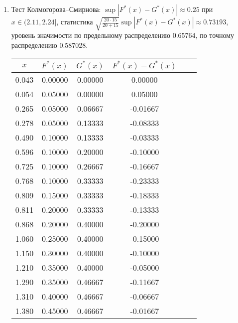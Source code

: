 \documentclass[a4paper,12pt]{article}
\newcommand{\modulus}[1]{\left | #1 \right |}
\begin{document}
\begin{enumerate}
        \item Тест Колмогорова--Смирнова: $\sup \modulus{F^*(x) - G^*(x)} \approx 0.25$ при $x \in (2.11, 2.24]$, статистика
              $\sqrt{\frac{20 \cdot 15}{20 + 15}} \sup \modulus{F^*(x) - G^*(x)} \approx 0.73193$, уровень значимости по предельному распределению 0.65764,
              по точному распределению 0.587028.

              \begin{tabular}{|c|c|c|c|c|c|}
                  \hline
                  $x$   & $F^*(x)$ & $G^*(x)$ & $F^*(x) - G^*(x)$        \\
                  \hline
                  0.043 & 0.00000  & 0.00000  & 0.00000                  \\
                  0.054 & 0.05000  & 0.00000  & 0.05000                  \\
                  0.265 & 0.05000  & 0.06667  & -0.01667                 \\
                  0.278 & 0.05000  & 0.13333  & -0.08333                 \\
                  0.490 & 0.10000  & 0.13333  & -0.03333                 \\
                  0.596 & 0.10000  & 0.20000  & -0.10000                 \\
                  0.725 & 0.10000  & 0.26667  & -0.16667                 \\
                  0.768 & 0.10000  & 0.33333  & -0.23333                 \\
                  0.809 & 0.15000  & 0.33333  & -0.18333                 \\
                  0.811 & 0.20000  & 0.33333  & -0.13333                 \\
                  0.868 & 0.20000  & 0.40000  & -0.20000                 \\
                  1.060 & 0.25000  & 0.40000  & -0.15000                 \\
                  1.150 & 0.30000  & 0.40000  & -0.10000                 \\
                  1.210 & 0.35000  & 0.40000  & -0.05000                 \\
                  1.290 & 0.35000  & 0.46667  & -0.11667                 \\
                  1.310 & 0.40000  & 0.46667  & -0.06667                 \\
                  1.380 & 0.45000  & 0.46667  & -0.01667                 \\

\end{tabular}
\end{enumerate}
\end{document}

